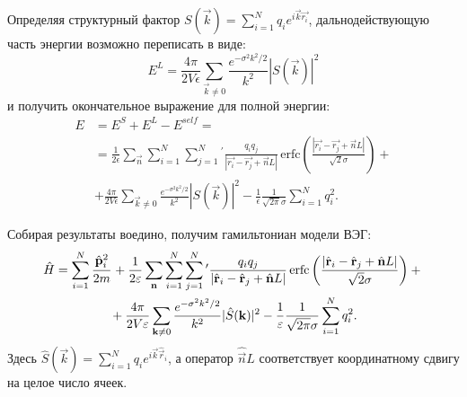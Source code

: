 Определяя структурный фактор $S (\vec{k}) = \sum_{i=1}^N q_i e^{i\vec{k} \vec{r_i}}$, дальнодействующую часть энергии возможно переписать в виде:
\begin{equation}
    \label{eq:jel:E_L_from_S}
    E^L = \frac{4\pi}{2V \epsilon} \sum_{\vec{k} \neq 0} \frac{e^{-\sigma^2 k^2 /2}}{k^2} | S (\vec{k}) |^2
\end{equation}
и получить окончательное выражение для полной энергии:
\begin{equation}
\label{eq:jel:total_energy_final}
\begin{aligned}
    E &= E^S + E^L - E^{self} = \\
    &= \frac{1}{2 \epsilon} \sum_{\vec{n}} \sum_{i=1}^N \sum_{j=1}^N {}^\prime \frac{q_i q_j}{|\vec{r_i} - \vec{r_j} + \vec{n}L|}\, \mathrm{erfc} \left( \frac{ |\vec{r_i} - \vec{r_j} + \vec{n}L| }{ \sqrt{2} \sigma } \right) + \\
    &+ \frac{4\pi}{2V \epsilon} \sum_{\vec{k} \neq 0} \frac{e^{-\sigma^2 k^2 / 2}}{k^2} | S (\vec{k}) |^2 - \frac{1}{\epsilon} \frac{1}{\sqrt{2\pi} \sigma} \sum_{i=1}^N q_i^2.
\end{aligned}
\end{equation}

Собирая результаты воедино, получим гамильтониан модели ВЭГ:
\begin{multline}
    \label{eq:jel:ham_final}
        \hat{H} = \sum\limits_{i=1}^{N} \cfrac{\hat{\vec{p}}_{i}^2}{2m}\, +
        \frac{1}{2 \epsilon} \sum_{\vec{n}} \sum_{i=1}^N \sum_{j=1}^N {}^\prime \frac{q_i q_j}{|\hat{\vec{r}}_i - \hat{\vec{r}}_j + \hat{\vec{n}}L|}\, \mathrm{erfc} \left( \frac{ |\hat{\vec{r}}_i - \hat{\vec{r}}_j + \hat{\vec{n}}L| }{ \sqrt{2} \sigma } \right) + {} \\
        {} + \frac{4\pi}{2V \epsilon} \sum_{\vec{k} \neq 0} \frac{e^{-\sigma^2 k^2 / 2}}{k^2} | \hat{S} (\vec{k}) |^2 - \frac{1}{\epsilon} \frac{1}{\sqrt{2\pi} \sigma} \sum_{i=1}^N q_i^2.
\end{multline}
Здесь $\hat{S} (\vec{k}) = \sum\limits_{i=1}^{N} q_{i} e^{i \vec{k} \hat{\vec{r}}_{i}}$, а оператор $\hat{\vec{n}}L$ соответствует координатному сдвигу на целое число ячеек.

